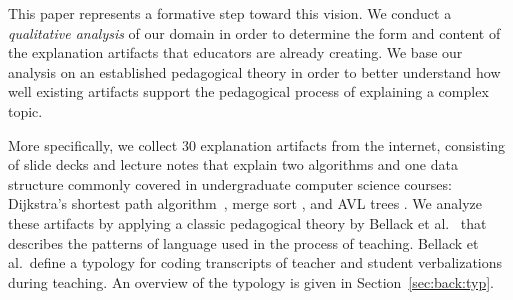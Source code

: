 \documentclass[conference]{IEEEtran}
\begin{document}
This paper represents a formative step toward this vision. We conduct a
\emph{qualitative analysis} of our domain in order to determine the form and
content of the explanation artifacts that educators are already creating.
%
We base our analysis on an established pedagogical theory in order to better
understand how well existing artifacts support the pedagogical process of
explaining a complex topic.


More specifically, we collect 30 explanation artifacts from the internet,
consisting of slide decks and lecture notes that explain two algorithms and one
data structure commonly covered in undergraduate computer science courses:
Dijkstra's shortest path algorithm~\cite[pp.~137--142]{KT06}, merge sort
\cite[210--214]{KT06}, and AVL trees \cite[pp.~458--475]{KnuthArt3}.
%
We analyze these artifacts by applying a classic pedagogical theory by Bellack
et al.~\cite{bellack1966language} that describes the patterns of language used
in the process of teaching. Bellack et al.\ define a typology for coding
transcripts of teacher and student verbalizations during teaching. An overview
of the typology is given in Section~\ref{sec:back:typ}.
\end{document}
